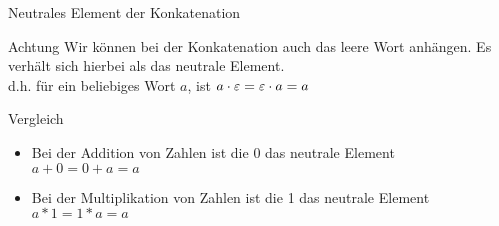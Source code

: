 \begin{frame}{Neutrales Element der Konkatenation}
    \begin{alertblock}{Achtung}
        Wir können bei der Konkatenation auch das leere Wort anhängen. Es verhält sich hierbei als das \alert<1>{neutrale Element}.\\
        d.h. für ein beliebiges Wort $a$, ist $a\cdot\varepsilon = \varepsilon\cdot a=a$
        \begin{exampleblock}{Vergleich}
        \begin{itemize}
            \item Bei der Addition von Zahlen ist die 0 das neutrale Element\\
            $a+0=0+a=a$
            \item Bei der Multiplikation von Zahlen ist die 1 das neutrale Element\\
            $a*1=1*a=a$
        \end{itemize}
        
        \end{exampleblock}
    \end{alertblock}
\end{frame}
